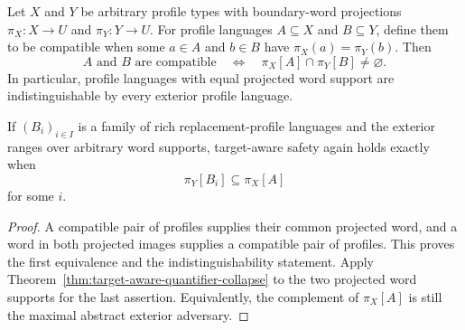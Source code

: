 \begin{theorem}
\label{thm:target-aware-profile-erasure}
Let \(X\) and \(Y\) be arbitrary profile types with boundary-word projections
\(\pi_X:X\to U\) and \(\pi_Y:Y\to U\).  For profile languages
\(A\subseteq X\) and \(B\subseteq Y\), define them to be compatible when some
\(a\in A\) and \(b\in B\) have \(\pi_X(a)=\pi_Y(b)\).  Then
\[
 A\text{ and }B\text{ are compatible}
 \quad\Longleftrightarrow\quad
 \pi_X[A]\cap\pi_Y[B]\ne\varnothing.
\]
In particular, profile languages with equal projected word support are
indistinguishable by every exterior profile language.

If \((B_i)_{i\in I}\) is a family of rich replacement-profile languages and
the exterior ranges over arbitrary word supports, target-aware safety again
holds exactly when
\[
                 \pi_Y[B_i]\subseteq\pi_X[A]
\]
for some \(i\).
\end{theorem}

\begin{proof}
A compatible pair of profiles supplies their common projected word, and a
word in both projected images supplies a compatible pair of profiles.  This
proves the first equivalence and the indistinguishability statement.  Apply
Theorem~\ref{thm:target-aware-quantifier-collapse} to the two projected word
supports for the last assertion.  Equivalently, the complement of
\(\pi_X[A]\) is still the maximal abstract exterior adversary.
\end{proof}

